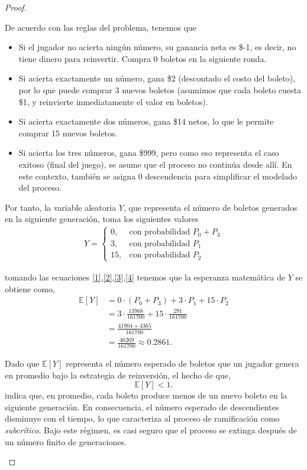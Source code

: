 \documentclass{article}
\begin{document}
\begin{proof}
\begin{itemize}
De acuerdo con las reglas del problema, tenemos que
\begin{itemize}
    \item Si el jugador no acierta ningún número, su ganancia neta es \$-1, es decir, no tiene dinero para reinvertir. Compra 0 boletos en la siguiente ronda.
    \item Si acierta exactamente un número, gana \$2 (descontado el costo del boleto), por lo que puede comprar 3 nuevos boletos (asumimos que cada boleto cuesta \$1, y reinvierte inmediatamente el valor en boletos).
    \item Si acierta exactamente dos números, gana \$14 netos, lo que le permite comprar 15 nuevos boletos.
    \item Si acierta los tres números, gana \$999, pero como eso representa el caso exitoso (final del juego), se asume que el proceso no continúa desde allí. En este contexto, también se asigna 0 descendencia para simplificar el modelado del proceso.
\end{itemize}

Por tanto, la variable aleatoria \( Y \), que representa el número de boletos generados en la siguiente generación, toma los siguientes valores
\begin{align*}
Y = \begin{cases}
0, & \text{con probabilidad } P_0 + P_3 \\
3, & \text{con probabilidad } P_1 \\
15, & \text{con probabilidad } P_2
\end{cases}
\end{align*}

tomando las ecuaciones \eqref{1},\eqref{2},\eqref{3},\eqref{4} tenemos que la esperanza matemática de \( Y \) se obtiene como,
\begin{align*}
\mathbb{E}[Y] &= 0 \cdot (P_0 + P_3) + 3 \cdot P_1 + 15 \cdot P_2 \\
&= 3 \cdot \frac{13968}{161700} + 15 \cdot \frac{291}{161700} \\
&= \frac{41904 + 4365}{161700} \\
&= \frac{46269}{161700}
\approx 0.2861.
\end{align*}

Dado que \( \mathbb{E}[Y] \) representa el número esperado de boletos que un jugador genera en promedio bajo la estrategia de reinversión, el hecho de que,
\[
\mathbb{E}[Y] < 1.
\]
indica que, en promedio, cada boleto produce menos de un nuevo boleto en la siguiente generación. En consecuencia, el número esperado de descendientes disminuye con el tiempo, lo que caracteriza al proceso de ramificación como \textit{subcrítico}. Bajo este régimen, es casi seguro que el proceso se extinga después de un número finito de generaciones.
\end{itemize}


\end{proof}
\end{document}
